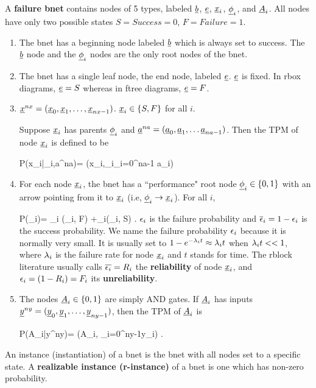 A {\bf failure bnet} contains
nodes of 5  types,
labeled ${\underline{b}}$, ${\underline{e}}$, ${\underline{x}}_i$,
$\underline{\phi}_i$, and ${\underline{A}}_i$.
All nodes have only
two possible states
$S=Success=0$, $F=Failure=1$.
\begin{enumerate}
\item 
The bnet has a beginning node labeled
${\underline{b}}$ which is always set to success.
The ${\underline{b}}$ node
and the $\underline{\phi}_i$
nodes are the only root nodes of
the bnet.

\item The bnet has 
a single leaf node, the end node, labeled 
${\underline{e}}$. ${\underline{e}}$ is fixed.
In rbox diagrams,
${\underline{e}}=S$
whereas in ftree diagrams, ${\underline{e}}=F$.

\item
${\underline{x}}^{nx}=
({\underline{x}}_0, {\underline{x}}_1, \ldots, {\underline{x}}_{nx-1})$.
${\underline{x}}_i\in \{S, F\}$ for all $i$.

Suppose ${\underline{x}}_i$
has parents 
$\underline{\phi}_i$ and ${\underline{a}}^{na}=({\underline{a}}_0, {\underline{a}}_1,
\dots {\underline{a}}_{na-1})$.
Then the TPM of node ${\underline{x}}_i$ is
defined to be

 
\beq\color{blue}
P(x_i|\phi_i,a^{na})=
\delta(x_i,\phi_i\V  \V_{i=0}^{na-1} a_i)
\eeq

\item
For each node ${\underline{x}}_i$, the bnet has
 a ``performance"
 root node $\underline{\phi}_i\in \{0,1\}$
with an arrow
pointing from it 
to ${\underline{x}}_i$ (i.e, 
$\underline{\phi}_i\rightarrow {\underline{x}}_i$).
For all $i$,

\beq \color{blue}
P(\phi_i)=
\eps_i \delta(\phi_i, F)
+\ol{\eps}_i\delta(\phi_i, S)
\;.
\eeq
$\epsilon_i$ is the failure probability
and $\overline{\epsilon}_i=1-\epsilon_i$
is the success probability.
We name the failure
probability $\epsilon_i$
because it
is normally very small.
It is usually
set to
$1-e^{-\lambda_it}\approx \lambda_it$
when $\lambda_it<<1$,
where $\lambda_i$
is the failure rate
for node ${\underline{x}}_i$
and $t$ stands for time.
The rblock
literature
usually calls 
$\overline{\epsilon_i}=R_i$
the {\bf reliability}
 of 
node ${\underline{x}}_i$,
and 
$\epsilon_i=(1-R_i)=F_i$
its {\bf unreliability}.


\item
The nodes ${\underline{A}}_i\in \{0,1\}$ 
are simply AND gates.
If ${\underline{A}}_i$ has inputs ${\underline{y}}^{ny}=
({\underline{y}}_0, {\underline{y}}_1,
\ldots, {\underline{y}}_{ny-1})$,
then the TPM of ${\underline{A}}_i$ is

\beq\color{blue}
P(A_i|y^{ny})=
\delta(A_i, \A_{i=0}^{ny-1}y_i)
\;.
\eeq

\end{enumerate}

An instance (instantiation)
of a bnet is the bnet 
with all nodes set to
a specific state.
A {\bf realizable instance (r-instance)}
of a bnet is one
which has non-zero probability.

